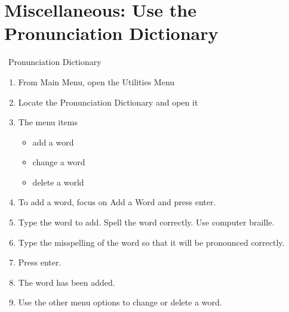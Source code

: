 \documentclass[10pt,letterpaper,twoside]{report}
\begin{document}
{{{\section{Miscellaneous: Use the Pronunciation Dictionary}
\
Pronunciation Dictionary
\begin{enumerate}
	\item From Main Menu, open the Utilities Menu 
	\item Locate the Pronunciation Dictionary and open it
	\item The menu items
	      \begin{itemize}
		      \item add a word
		      \item change a word
		      \item delete a world
	      \end{itemize}
	\item To add a word, focus on Add a Word and press enter.
	\item Type the word to add. Spell the word correctly. Use computer braille.
	\item Type the misspelling of the word so that it will be pronounced correctly.
	\item Press enter.
	\item The word has been added.
	\item Use the other menu options to change or delete a word.
\end{enumerate}

}}}
\end{document}
